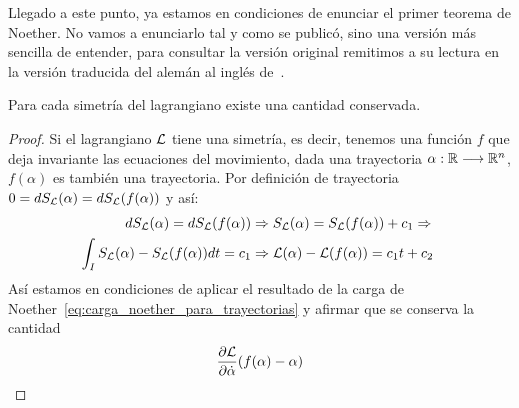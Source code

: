 Llegado a este punto, ya estamos en condiciones de enunciar el primer teorema de Noether.
No vamos a enunciarlo tal y como se publicó, sino una versión más sencilla de entender, para consultar la versión original remitimos a su lectura en la versión traducida del alemán al inglés de~\cite{Noether1971}.

\begin{theorem}
	\label{thm:noether}
	Para cada simetría del lagrangiano existe una cantidad conservada.
\end{theorem}
\begin{proof}
	Si el lagrangiano $\mathcal{L}$ tiene una simetría, es decir, tenemos una función $f$ que deja invariante las ecuaciones del movimiento, dada una trayectoria $\alpha:\mathbb{R}\longrightarrow \mathbb{R}^n$, $f(\alpha)$ es también una trayectoria.
	Por definición de trayectoria $0=dS_{\mathcal{L}}(\alpha)=dS_{\mathcal{L}}(f(\alpha))$ y así:
	\begin{equation}
		\begin{split}
			\label{eq:teorema-noether}
			dS_{\mathcal{L}}(\alpha) = dS_{\mathcal{L}}(f(\alpha)) &\Rightarrow S_{\mathcal{L}}(\alpha)=S_{\mathcal{L}}(f(\alpha))+c_1\Rightarrow\\
			\int_I S_{\mathcal{L}}(\alpha)-S_{\mathcal{L}}(f(\alpha)) dt= c_1 &\Rightarrow \mathcal{L}(\alpha)-\mathcal{L}(f(\alpha))=c_1 t + c_2\
		\end{split}
	\end{equation}
	Así estamos en condiciones de aplicar el resultado de la carga de Noether~\eqref{eq:carga_noether_para_trayectorias} y afirmar que se conserva la cantidad
	\begin{equation*}
		\frac{\partial \mathcal{L}}{\partial\dot{\alpha}}(f(\alpha)-\alpha)
	\end{equation*}
\end{proof}

